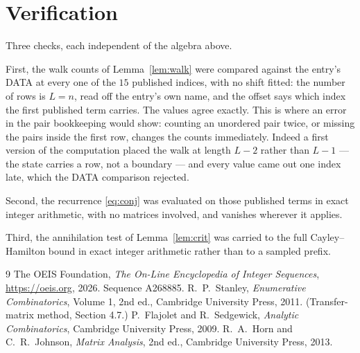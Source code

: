 \documentclass[11pt,a4paper]{article}
\theoremstyle{plain}
\theoremstyle{definition}
\begin{document}
\section{Verification}

Three checks, each independent of the algebra above.

First, the walk counts of Lemma~\ref{lem:walk} were compared against the entry's DATA at
every one of the $15$ published indices, with no shift fitted: the number of rows is
$L=n$, read off the entry's own name, and the offset says which index the first
published term carries. The values agree exactly. This is where an error in the pair
bookkeeping would show: counting an unordered pair twice, or missing the pairs inside the
first row, changes the counts immediately. Indeed a first version of the computation
placed the walk at length $L-2$ rather than $L-1$ --- the state carries a row, not a
boundary --- and every value came out one index late, which the DATA comparison rejected.

Second, the recurrence \eqref{eq:conj} was evaluated on those published terms in exact
integer arithmetic, with no matrices involved, and vanishes wherever it applies.

Third, the annihilation test of Lemma~\ref{lem:crit} was carried to the full
Cayley--Hamilton bound in exact integer arithmetic rather than to a sampled prefix.

\begin{thebibliography}{9}
 The OEIS Foundation, \emph{The On-Line Encyclopedia of Integer
Sequences}, \url{https://oeis.org}, 2026. Sequence A268885.
 R.~P.~Stanley, \emph{Enumerative Combinatorics}, Volume 1, 2nd ed.,
Cambridge University Press, 2011. (Transfer-matrix method, Section 4.7.)
 P.~Flajolet and R.~Sedgewick, \emph{Analytic Combinatorics}, Cambridge
University Press, 2009.
 R.~A.~Horn and C.~R.~Johnson, \emph{Matrix Analysis}, 2nd ed., Cambridge
University Press, 2013.
\end{thebibliography}
\end{document}
